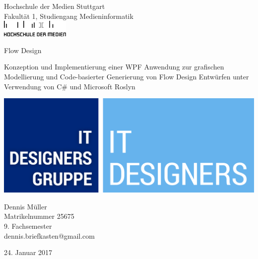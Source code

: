 \thispagestyle{empty}

\begin{center}
	

\large{Hochschule der Medien Stuttgart\\
Fakultät 1, Studiengang Medieninformatik}\\
\vspace{1cm}
\includegraphics[scale=1]{img/HdM-Logo.png}
\vspace{1.5cm}

\huge{Flow Design}

\large{Konzeption und Implementierung einer WPF Anwendung zur grafischen Modellierung und	Code-basierter Generierung von Flow Design Entwürfen unter Verwendung von C\# und Microsoft Roslyn}

\vspace{1cm}

\vspace{1cm}
\includegraphics[scale=0.07]{img/IT_DESIGNERS.jpg}
\vspace{1.5cm}

\large{
	Dennis Müller \\
	Matrikelnummer 25675\\
	9. Fachsemester\\
	dennis.briefkasten@gmail.com}

\vspace{3cm}
{24. Januar 2017}
\end{center}